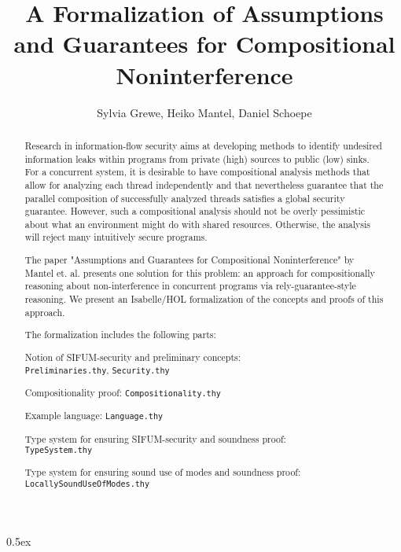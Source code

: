 \documentclass[11pt,a4paper]{article}
\title{A Formalization of
Assumptions and Guarantees for Compositional Noninterference}
\author{Sylvia Grewe, Heiko Mantel, Daniel Schoepe}
\begin{document}
\maketitle
\parindent 0pt\parskip 0.5ex

\begin{abstract}
  Research in information-flow security aims at developing methods to
  identify undesired information leaks within programs from private
  (high) sources to public (low) sinks. For a concurrent system, it is
  desirable to have compositional analysis methods that allow for
  analyzing each thread independently and that nevertheless guarantee
  that the parallel composition of successfully analyzed threads
  satisfies a global security guarantee. However, such a compositional
  analysis should not be overly pessimistic about what an environment
  might do with shared resources. Otherwise, the analysis will reject
  many intuitively secure programs.

  The paper "Assumptions and Guarantees for Compositional
  Noninterference" by Mantel et. al. \cite{conf/csfw/MantelSS11}
  presents one solution for this problem: an approach for
  compositionally reasoning about non-interference in concurrent
  programs via rely-guarantee-style reasoning.  We present an
  Isabelle/HOL formalization of the concepts and proofs of this
  approach.

The formalization includes the following parts:

\begin{compactitem}
\item Notion of SIFUM-security and preliminary concepts:\\
  \texttt{Preliminaries.thy}, \texttt{Security.thy}
\item Compositionality proof: \texttt{Compositionality.thy}
\item Example language: \texttt{Language.thy}
\item Type system for ensuring SIFUM-security and soundness proof: \\
  \texttt{TypeSystem.thy}
\item Type system for ensuring sound use of modes and soundness proof:
  \texttt{LocallySoundUseOfModes.thy}
\end{compactitem}

\end{abstract}

\tableofcontents















\end{document}
